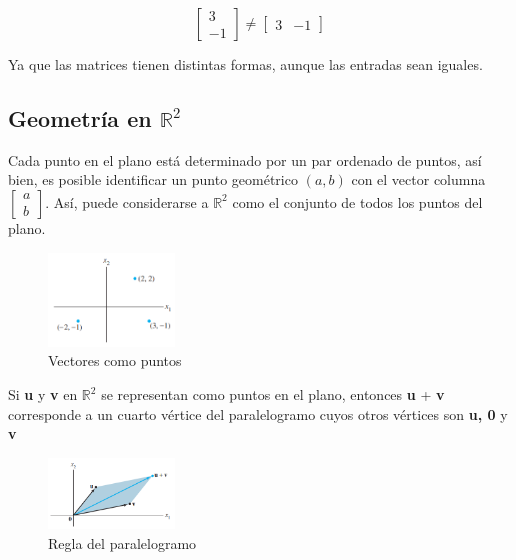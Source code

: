 \documentclass{article}
\begin{document}
\begin{equation*}
    \begin{bmatrix}
        3\\
        -1
    \end{bmatrix} 
    \neq 
    \begin{bmatrix}
        3 & -1
    \end{bmatrix}
\end{equation*}

Ya que las matrices tienen distintas formas, aunque las entradas sean iguales.

\subsection*{Geometría en $\mathbb{R}^2$}

Cada punto en el plano está determinado por un par ordenado de puntos, así bien, es posible identificar un punto geométrico $(a, b)$ con el vector columna  $\begin{bmatrix} a\\b \end{bmatrix}$. Así, puede considerarse a $\mathbb{R}^2$ como el conjunto de todos los puntos del plano.

\begin{figure}[ht]
    \centerline{\includegraphics[width=0.3\textwidth]{image6.png}}
    \caption{Vectores como puntos}
    \label{}
\end{figure}

\begin{tcolorbox}[colback=green!20!white,colframe=green!80!black,title=Regla del Paralelogramo para la adición]
    Si \textbf{u} y \textbf{v} en $\mathbb{R}^2$ se representan como puntos en el plano, entonces \textbf{u} + \textbf{v} corresponde a un cuarto vértice del paralelogramo cuyos otros vértices son \textbf{u, 0} y \textbf{v}
\end{tcolorbox}

\begin{figure}[ht]
    \centerline{\includegraphics[width=0.3\textwidth]{image7.png}}
    \caption{Regla del paralelogramo}
    \label{}
\end{figure}
\end{document}
